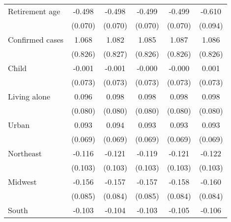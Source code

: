 {\begin{tabular}{l*{5}{c}}
\addlinespace
Retirement age      &      -0.498\sym{***}&      -0.498\sym{***}&      -0.499\sym{***}&      -0.499\sym{***}&      -0.610\sym{***}\\
                    &     (0.070)         &     (0.070)         &     (0.070)         &     (0.070)         &     (0.094)         \\
\addlinespace
Confirmed cases     &       1.068         &       1.082         &       1.085         &       1.087         &       1.086         \\
                    &     (0.826)         &     (0.827)         &     (0.826)         &     (0.826)         &     (0.826)         \\
\addlinespace
Child               &      -0.001         &      -0.001         &      -0.000         &      -0.000         &       0.001         \\
                    &     (0.073)         &     (0.073)         &     (0.073)         &     (0.073)         &     (0.073)         \\
\addlinespace
Living alone        &       0.096         &       0.098         &       0.098         &       0.098         &       0.098         \\
                    &     (0.080)         &     (0.080)         &     (0.080)         &     (0.080)         &     (0.080)         \\
\addlinespace
Urban               &       0.093         &       0.094         &       0.093         &       0.093         &       0.093         \\
                    &     (0.069)         &     (0.069)         &     (0.069)         &     (0.069)         &     (0.069)         \\
\addlinespace
Northeast           &      -0.116         &      -0.121         &      -0.119         &      -0.121         &      -0.122         \\
                    &     (0.103)         &     (0.103)         &     (0.103)         &     (0.103)         &     (0.103)         \\
\addlinespace
Midwest             &      -0.156\sym{*}  &      -0.157\sym{*}  &      -0.157\sym{*}  &      -0.158\sym{*}  &      -0.160\sym{*}  \\
                    &     (0.085)         &     (0.084)         &     (0.085)         &     (0.084)         &     (0.084)         \\
\addlinespace
South               &      -0.103         &      -0.104         &      -0.103         &      -0.105         &      -0.106         \\

\end{tabular}}

